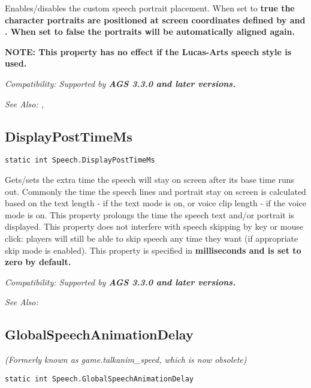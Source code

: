 Enables/disables the custom speech portrait placement. When set to \bf{true} the character portraits are positioned at screen coordinates defined by  and . When set to \bf{false} the portraits will be automatically aligned again.

\bf{NOTE:} This property has no effect if the Lucas-Arts speech style is used.

\it{Compatibility:} Supported by \bf{AGS 3.3.0} and later versions.

\it{See Also:} ,


\subsection{DisplayPostTimeMs}\label{Speech.DisplayPostTimeMs}%

\begin{verbatim}
static int Speech.DisplayPostTimeMs
\end{verbatim}

Gets/sets the extra time the speech will stay on screen after its base time runs out.
Commonly the time the speech lines and portrait stay on screen is calculated based on the text length - if the text mode is on, or voice clip length - if the voice mode is on. This property prolongs the time the speech text and/or portrait is displayed.
This property does not interfere with speech skipping by key or mouse click: players will still be able to skip speech any time they want (if appropriate skip mode is enabled).
This property is specified in \bf{milliseconds} and is set to zero by default.

\it{Compatibility:} Supported by \bf{AGS 3.3.0} and later versions.

\it{See Also:} 


\subsection{GlobalSpeechAnimationDelay}\label{Speech.GlobalSpeechAnimationDelay}%

\it{(Formerly known as game.talkanim_speed, which is now obsolete)}

\begin{verbatim}
static int Speech.GlobalSpeechAnimationDelay
\end{verbatim}

